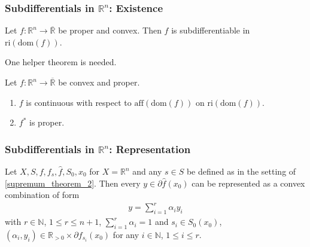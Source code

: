\documentclass[10pt, hyperref={hidelinks}]{beamer}
\begin{document}
    \begin{frame}
        \frametitle{Subdifferentials in \(\mathbb{R}^n\): Existence}

        \pause
    
        \begin{theorem}
            Let \(f\colon \mathbb{R}^n \to \overline{\mathbb{R}}\) be proper and convex. Then \(f\) is subdifferentiable in \(\text{ri}(\text{dom}(f))\).
        \end{theorem}

        \pause

        \phantom{}

        One helper theorem is needed.

        \phantom{}

        \pause

        \begin{lemma} \label{proper_convex_continuity_lemma}
            Let \(f\colon \mathbb{R}^n \to \overline{\mathbb{R}}\) be convex and proper.
            \begin{enumerate}[label=(\roman*), wide]
                \item \label{proper_convex_continuity_lemma_1} \(f\) is continuous with respect to \(\text{aff}({\text{dom}(f)})\) on \(\text{ri}(\text{dom}(f))\).
                \item \label{proper_convex_continuity_lemma_2} \(f^*\) is proper.
            \end{enumerate}
        \end{lemma}
    \end{frame}

    \begin{frame}
        \frametitle{Subdifferentials in \(\mathbb{R}^n\): Representation}

        \pause

        \begin{theorem} \label{finite_dim_representation_theorem}
            Let \(X, S, f, f_s, \hat{f}, S_0, x_0\) for \(X = \mathbb{R}^n\) and any \(s \in S\) be defined as in the setting of  \ref{supremum_theorem_2}. Then every \(y \in \partial \hat{f}(x_0)\) can be represented as a convex combination of form
            \begin{align*}
                y = \sum_{i=1}^r \alpha_i y_i
            \end{align*}
            with \(r \in \mathbb{N}\), \(1 \leq r \leq n+1\), \(\sum_{i=1}^r \alpha_i = 1\) and \(s_i \in S_0(x_0)\), \((\alpha_i, y_i) \in \mathbb{R}_{>0} \times \partial f_{s_i}(x_0)\) for any \(i \in \mathbb{N}\), \(1 \leq i \leq r\).
        \end{theorem}
    \end{frame}
\end{document}
